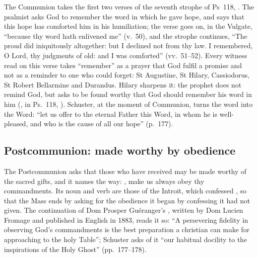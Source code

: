 The Communion takes the first two verses of the seventh strophe of Ps~118,
. The psalmist asks God to remember the word in which he gave hope,
and says that this hope has comforted him in his humiliation; the verse goes on,
in the Vulgate, ``because thy word hath enlivened me'' (v.~50), and the strophe
continues, ``The proud did iniquitously altogether: but I declined not from thy
law. I remembered, O Lord, thy judgments of old: and I was comforted''
(vv.~51--52). Every witness read on this verse takes ``remember'' as a prayer
that God fulfil a promise and not as a reminder to one who could forget: St
Augustine, St Hilary, Cassiodorus, St Robert Bellarmine and Durandus. Hilary
sharpens it: the prophet does not remind God, but asks to be found worthy that
God should remember his word in him (, in
Ps.~118, ). Schuster, at the moment of Communion, turns the word
into the Word: ``let us offer to the eternal Father this Word, in whom he is
well-pleased, and who is the cause of all our hope'' (p.~177).

\subsection{Postcommunion: made worthy by obedience}

The Postcommunion asks that those who have received may be made worthy of the
sacred gifts, and it names the way: , make us always obey thy commandments. Its noun and verb are
those of the Introit, which confessed , so
that the Mass ends by asking for the obedience it began by confessing it had not
given. The continuation of Dom Prosper Guéranger's ,
written by Dom Lucien Fromage and published in English in 1883, reads it so:
``A persevering fidelity in observing God's commandments is the best
preparation a christian can make for approaching to the holy Table''; Schuster
asks of it ``our habitual docility to the inspirations of the Holy Ghost''
(pp.~177--178).
